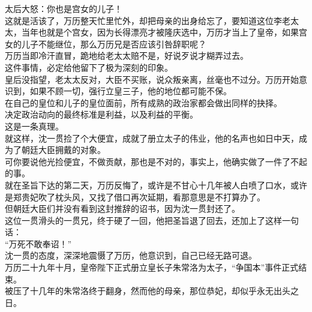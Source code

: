 \begin{multicols}{\theparacolNo}
太后大怒：你也是宫女的儿子！\\

这就是活该了，万历整天忙里忙外，却把母亲的出身给忘了，要知道这位李老太太，当年也就是个宫女，因为长得漂亮才被隆庆选中，万历才当上了皇帝，如果宫女的儿子不能继位，那么万历兄是否应该引咎辞职呢？\\

万历当即冷汗直冒，跪地给老太太赔不是，好说歹说才糊弄过去。\\

这件事情，必定给他留下了极为深刻的印象。\\

皇后没指望，老太太反对，大臣不买账，说众叛亲离，丝毫也不过分。万历开始意识到，如果不顾一切，强行立皇三子，他的地位都可能不保。\\

在自己的皇位和儿子的皇位面前，所有成熟的政治家都会做出同样的抉择。\\

决定政治动向的最终标准是利益，以及利益的平衡。\\

这是一条真理。\\

就这样，沈一贯捡了个大便宜，成就了册立太子的伟业，他的名声也如日中天，成为了朝廷大臣拥戴的对象。\\

可你要说他光捡便宜，不做贡献，那也是不对的，事实上，他确实做了一件了不起的事。\\

就在圣旨下达的第二天，万历反悔了，或许是不甘心十几年被人白喷了口水，或许是郑贵妃吹了枕头风，又找了借口再次延期，看那意思是不打算办了。\\

但朝廷大臣们并没有看到这封推辞的诏书，因为沈一贯封还了。\\

这位一贯滑头的一贯兄，终于硬了一回，他把圣旨退了回去，还加上了这样一句话：\\

“万死不敢奉诏！”\\

沈一贯的态度，深深地震慑了万历，他意识到，自己已经无路可退。\\

万历二十九年十月，皇帝陛下正式册立皇长子朱常洛为太子，“争国本”事件正式结束。\\

被压了十几年的朱常洛终于翻身，然而他的母亲，那位恭妃，却似乎永无出头之日。\\


\end{multicols}
